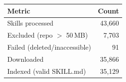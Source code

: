 \begin{tabular}{lr}
  \toprule
  \textbf{Metric} & \textbf{Count} \\
  \midrule
  Skills processed              & 43,660 \\
  Excluded (repo $>$ 50\,MB)    & 7,703 \\
  Failed (deleted/inaccessible) & 91 \\
  Downloaded                    & 35,866 \\
  Indexed (valid SKILL.md)      & 35,129 \\
  \bottomrule
\end{tabular}
